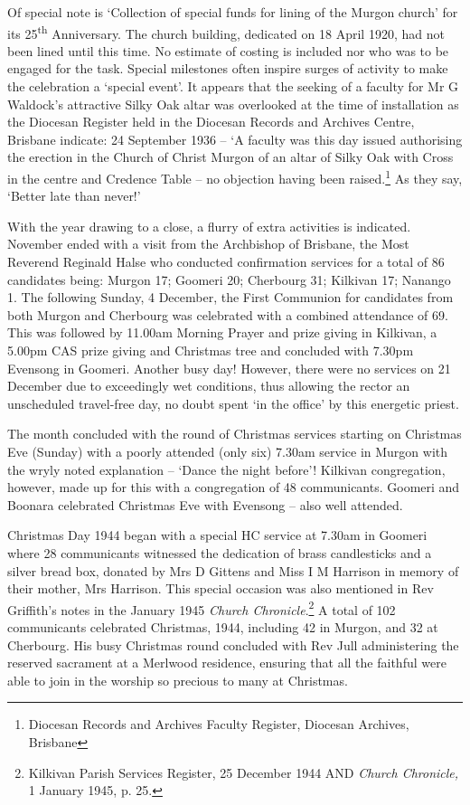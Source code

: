 Of special note is `Collection of special funds for lining of the Murgon church' for its 25\textsuperscript{th} Anniversary. The church building, dedicated on 18 April 1920, had not been lined until this time. No estimate of costing is included nor who was to be engaged for the task. Special milestones often inspire surges of activity to make the celebration a `special event'. It appears that the seeking of a faculty for Mr G Waldock's attractive Silky Oak altar was overlooked at the time of installation as the Diocesan Register held in the Diocesan Records and Archives Centre, Brisbane indicate: 24 September 1936 -- `A faculty was this day issued authorising the erection in the Church of Christ Murgon of an altar of Silky Oak with Cross in the centre and Credence Table -- no objection having been raised.\footnote{Diocesan Records and Archives Faculty Register, Diocesan Archives, Brisbane} As they say, `Better late than never!'

With the year drawing to a close, a flurry of extra activities is indicated. November ended with a visit from the Archbishop of Brisbane, the Most Reverend Reginald Halse who conducted confirmation services for a total of 86 candidates being: Murgon 17; Goomeri 20; Cherbourg 31; Kilkivan 17; Nanango 1. The following Sunday, 4 December, the First Communion for candidates from both Murgon and Cherbourg was celebrated with a combined attendance of 69. This was followed by 11.00am Morning Prayer and prize giving in Kilkivan, a 5.00pm CAS prize giving and Christmas tree and concluded with 7.30pm Evensong in Goomeri. Another busy day! However, there were no services on 21 December due to exceedingly wet conditions, thus allowing the rector an unscheduled travel-free day, no doubt spent `in the office' by this energetic priest.

The month concluded with the round of Christmas services starting on Christmas Eve (Sunday) with a poorly attended (only six) 7.30am service in Murgon with the wryly noted explanation -- `Dance the night before'! Kilkivan congregation, however, made up for this with a congregation of 48 communicants. Goomeri and Boonara celebrated Christmas Eve with Evensong -- also well attended.

Christmas Day 1944 began with a special HC service at 7.30am in Goomeri where 28 communicants witnessed the dedication of brass candlesticks and a silver bread box, donated by Mrs D Gittens and Miss I M Harrison in memory of their mother, Mrs Harrison. This special occasion was also mentioned in Rev Griffith's notes in the January 1945 \emph{Church Chronicle}.\footnote{Kilkivan Parish Services Register, 25 December 1944 AND \emph{Church Chronicle,} 1 January 1945, p. 25.} A total of 102 communicants celebrated Christmas, 1944, including 42 in Murgon, and 32 at Cherbourg. His busy Christmas round concluded with Rev Jull administering the reserved sacrament at a Merlwood residence, ensuring that all the faithful were able to join in the worship so precious to many at Christmas.

